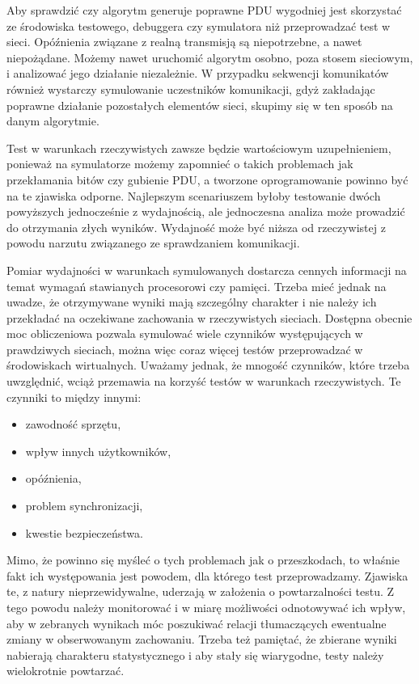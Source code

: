 \documentclass[00-praca-magisterska.tex]{subfiles}
\begin{document}
Aby sprawdzić czy algorytm generuje poprawne PDU wygodniej jest skorzystać
ze środowiska testowego, debuggera czy symulatora niż przeprowadzać test w
sieci. Opóźnienia związane z realną transmisją są niepotrzebne, a nawet
niepożądane. Możemy nawet uruchomić algorytm osobno, poza stosem sieciowym, i
analizować jego działanie niezależnie. W przypadku sekwencji komunikatów
również wystarczy symulowanie uczestników komunikacji, gdyż zakładając poprawne
działanie pozostałych elementów sieci, skupimy się w ten sposób na danym
algorytmie.

Test w warunkach rzeczywistych zawsze będzie wartościowym uzupełnieniem,
ponieważ na symulatorze możemy zapomnieć o takich problemach jak przekłamania
bitów czy gubienie PDU, a tworzone oprogramowanie powinno być na te zjawiska
odporne. Najlepszym scenariuszem byłoby testowanie dwóch powyższych
jednocześnie z wydajnością, ale jednoczesna analiza może prowadzić do
otrzymania złych wyników. Wydajność może być niższa od rzeczywistej z powodu
narzutu związanego ze sprawdzaniem komunikacji.

Pomiar wydajności w warunkach symulowanych dostarcza cennych informacji na
temat wymagań stawianych procesorowi czy pamięci. Trzeba mieć jednak na uwadze,
że otrzymywane wyniki mają szczególny charakter i nie należy ich przekładać na
oczekiwane zachowania w rzeczywistych sieciach. Dostępna obecnie moc
obliczeniowa pozwala symulować wiele czynników występujących w prawdziwych
sieciach, można więc coraz więcej testów przeprowadzać w środowiskach
wirtualnych. Uważamy jednak, że mnogość czynników, które trzeba uwzględnić,
wciąż przemawia na korzyść testów w warunkach rzeczywistych. Te czynniki to
między innymi:
\begin{itemize}
\item zawodność sprzętu,
\item wpływ innych użytkowników,
\item opóźnienia,
\item problem synchronizacji,
\item kwestie bezpieczeństwa.
\end{itemize}

Mimo, że powinno się myśleć o tych problemach jak o przeszkodach, to właśnie
fakt ich występowania jest powodem, dla którego test przeprowadzamy. Zjawiska
te, z natury nieprzewidywalne, uderzają w założenia o powtarzalności testu. Z
tego powodu należy monitorować i w miarę możliwości odnotowywać ich wpływ, aby
w zebranych wynikach móc poszukiwać relacji tłumaczących ewentualne zmiany w
obserwowanym zachowaniu. Trzeba też pamiętać, że zbierane wyniki nabierają
charakteru statystycznego i aby stały się wiarygodne, testy należy wielokrotnie
powtarzać.
\end{document}
